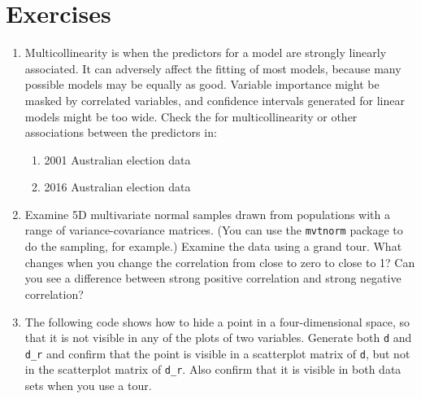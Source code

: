 \documentclass[
  letterpaper,
]{krantz}
\providecommand{\tightlist}{%
  \setlength{\itemsep}{0pt}\setlength{\parskip}{0pt}}\usepackage{longtable,booktabs,array}
\begin{document}
\section*{Exercises}\label{exercises-2}


\begin{enumerate}
\def\labelenumi{\arabic{enumi}.}
\tightlist
\item
  Multicollinearity is when the predictors for a model are strongly
  linearly associated. It can adversely affect the fitting of most
  models, because many possible models may be equally as good. Variable
  importance might be masked by correlated variables, and confidence
  intervals generated for linear models might be too wide. Check the for
  multicollinearity or other associations between the predictors in:

  \begin{enumerate}
  \def\labelenumii{\alph{enumii}.}
  \tightlist
  \item
    2001 Australian election data
  \item
    2016 Australian election data
  \end{enumerate}
\item
  Examine 5D multivariate normal samples drawn from populations with a
  range of variance-covariance matrices. (You can use the
  \texttt{mvtnorm} package to do the sampling, for example.) Examine the
  data using a grand tour. What changes when you change the correlation
  from close to zero to close to 1? Can you see a difference between
  strong positive correlation and strong negative correlation?
\item
  The following code shows how to hide a point in a four-dimensional
  space, so that it is not visible in any of the plots of two variables.
  Generate both \texttt{d} and \texttt{d\_r} and confirm that the point
  is visible in a scatterplot matrix of \texttt{d}, but not in the
  scatterplot matrix of \texttt{d\_r}. Also confirm that it is visible
  in both data sets when you use a tour.
\end{enumerate}
\end{document}
